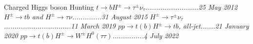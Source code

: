 \begin{MyArticle}[enhanced, tikz={rotate=0}, width=0.25\textwidth]{Charged Higgs boson
    Hunting}
  $t\rightarrow bH^{\pm}\rightarrow \tau^{\pm} \nu_{\tau}$............................\it{25 May 2012}\newline
  $H^{\pm}\rightarrow tb$ and $H^{\pm}\rightarrow \tau\nu$..............\it{31 August 2015}\newline
  $H^{\pm} \rightarrow \tau^{\pm} \nu_{\tau}$ ................................\it{11 March 2019}\newline
  $pp\rightarrow t(b)H^{\pm} \rightarrow tb$, all-jet.......\it{21 January 2020}\newline
  $pp\rightarrow t(b)H^{\pm} \rightarrow W^{\pm}H^{0}(\tau\tau)$...............\it{4 July 2022}
\end{MyArticle}


\begin{comment}
\begin{multimuons-1}[enhanced, tikz={rotate=0}, width=1.0\textwidth]{\huge Charged Higgs boson Hunting}

  \Large{$t\rightarrow bH^{\pm}\rightarrow \tau^{\pm} \nu_{\tau}$}............................\it{\Large 25 May 2012}\newline
  \Large{$H^{\pm}\rightarrow tb$ and $H^{\pm}\rightarrow \tau\nu$}..............\it{\Large 31 August 2015}\newline
  \Large{$H^{\pm} \rightarrow \tau^{\pm} \nu_{\tau}$}................................\it{\Large 11 March 2019}\newline
  \Large{$pp\rightarrow t(b)H^{\pm} \rightarrow tb$, all-jet}.......\it{\Large 21 January 2020}\newline
  \Large{$pp\rightarrow t(b)H^{\pm} \rightarrow W^{\pm}H^{0}(\tau\tau)$}...............\it{\Large 4 July 2022}
\end{multimuons-1}
\end{comment}
